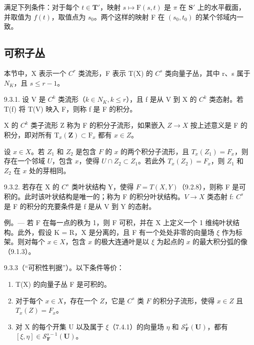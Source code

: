 满足下列条件：对于每个 \(t \in \mathbf{T}'\)，映射 \(s \mapsto \mathrm{F}(s, t)\) 是 \(\pi\) 在 \(\mathbf{S}'\) 上的水平截面，并取值为 \(f(t)\)，取值点为 \(s_0\)。两个这样的映射 F 在 \((s_0, t_0)\) 的某个邻域内一致。

\subsection{可积子丛}

本节中，X 表示一个 \(C^{r}\) 类流形，F 表示 T(X) 的 \(C^{s}\) 类向量子丛，其中 r、s 属于 \(N_{K}\)，且 \(s \leqslant r - 1\)。

9.3.1. 设 V 是 \(C^{k}\) 类流形（\(k \in N_{K}, k \leqslant r\)），且 f 是从 V 到 X 的 \(C^{k}\) 类态射。若 T(f) 将 T(V) 映入 F，则称 f 是 F 的积分。

X 的 \(C^{k}\) 类子流形 Z 称为 F 的积分子流形，如果嵌入 \(Z \rightarrow X\) 按上述意义是 F 的积分，即对所有 \(\mathrm{T}_{x}(\mathbf{Z}) \subset \mathrm{F}_{x}\) 都有 \(x \in Z\)。

设 \(x \in X\)。若 \(Z_1\) 和 \(Z_2\) 是包含 \(F\) 的 \(x\) 的两个积分子流形，且 \(T_x(Z_1) = F_x\)，则存在一个邻域 \(U\)，包含 \(x\)，使得 \(U \cap Z_2 \subset Z_1\)。若此外 \(T_x(Z_2) = F_x\)，则 \(Z_1\) 和 \(Z_2\) 在 \(x\) 处的芽相同。

9.3.2. 若存在 X 的 \(C^{s}\) 类叶状结构 Y，使得 \(F = T(X, Y)\)（9.2.8），则称 F 是可积的。此时该叶状结构是唯一的；称为 F 的积分叶状结构。\(V \to X\) 类态射 f: \(C^{s}\) 是 F 的积分的充要条件是 f 是从 V 到 Y 的态射。

例。--- 若 F 在每一点的秩为 1，则 F 可积，并在 X 上定义一个 1 维纯叶状结构。此外，假设 K = R，X 是分离的，且 F 有一个处处非零的向量场 \(\xi\) 作为标架。则对每个 \(x \in X\)，包含 \(x\) 的极大连通叶是以 \(\xi\) 为起点的 \(x\) 的最大积分弧的像（9.1.3）。

9.3.3（“可积性判据”）。以下条件等价：

\begin{enumerate}
\def\labelenumi{(\roman{enumi})}
\item
  T(X) 的向量子丛 F 是可积的。
\item
  对于每个 \(x \in X\)，存在一个 \(Z\)，它是 \(C^s\) 类 \(F\) 的积分子流形，使得 \(x \in Z\) 且 \(T_x(Z) = F_x\)。
\item
  对 X 的每个开集 U 以及属于 \(\xi\)（7.4.1）的向量场 \(\eta\) 和 \(\mathcal{S}_{\mathbf{F}}^{s}(\mathbf{U})\)，都有 \([\xi, \eta] \in \mathcal{S}_{\mathbf{F}}^{s-1}(\mathbf{U})\)。
\end{enumerate}

